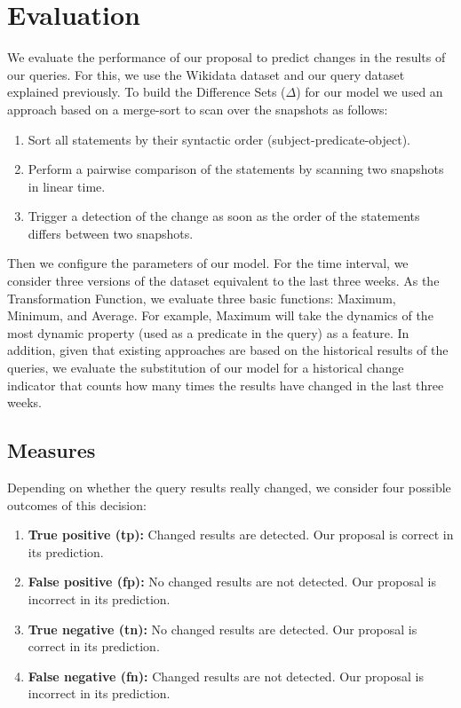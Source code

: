 \documentclass[runningheads]{llncs}
\begin{document}
\section{Evaluation}
\label{sec:eval}

We evaluate the performance of our proposal to predict changes in the results of our queries. For this, we use the Wikidata dataset and our query dataset explained previously.
To build the Difference Sets ($\Delta$) for our model we used an approach based on a merge-sort to scan over the snapshots as follows:

\begin{enumerate}
	\item Sort all statements by their syntactic order (subject-predicate-object).
	\item Perform a pairwise comparison of the statements by scanning two snapshots in linear time.
	\item Trigger a detection of the change as soon as the order of the statements differs between two snapshots.
\end{enumerate}

Then we configure the parameters of our model. For the time interval, we consider three versions of the dataset equivalent to the last three weeks. As the Transformation Function, we evaluate three basic functions: Maximum, Minimum, and Average. For example, Maximum will take the dynamics of the most dynamic property (used as a predicate in the query) as a feature. 
In addition, given that existing approaches are based on the historical results of the queries, we evaluate the substitution of our model for a historical change indicator that counts how many times the results have changed in the last three weeks.

\subsection{Measures}

Depending on whether the query results really changed, we consider four possible outcomes of this decision:

\begin{enumerate}[label=\roman*]
	\item \textbf{True positive (tp):} Changed results are detected. Our proposal is correct in its prediction.
	\item \textbf{False positive (fp):} No changed results are not detected. Our proposal is incorrect in its prediction.
	\item \textbf{True negative (tn):} No changed results are detected. Our proposal is correct in its prediction.
	\item \textbf{False negative (fn):} Changed results are not detected. Our proposal is incorrect in its prediction.        
	
\end{enumerate}
\end{document}
